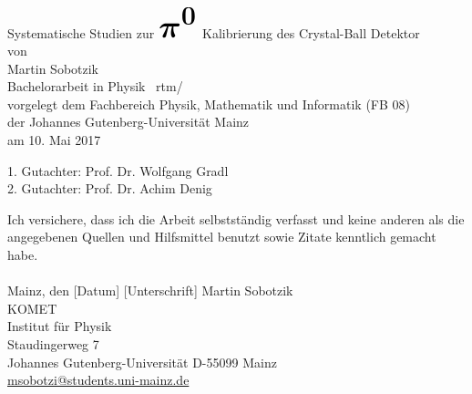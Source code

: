 \documentclass[a4paper,11pt,oneside,final,german,openbib,pdftex]{scrbook}
\begin{document}

\begin{titlepage}
  \vspace*{6mm}
  \begin{center}
     {\afont Systematische Studien zur 
     	$
     	\mathlarger{\mathlarger{\mathlarger{\mathlarger{\mathlarger{\mathlarger{
     									\boldsymbol
     									{
     										\pi^0
     									}
     								}}}}}}
     	$ 
     	Kalibrierung des Crystal-Ball Detektor}
     \\[3.5cm]
     {\large von}
     \\[3.5cm]
     {\dfont Martin Sobotzik}
     \\[2cm]
     {\large Bachelorarbeit in Physik \ rtm/\\
        vorgelegt dem Fachbereich Physik, Mathematik und Informatik (FB 08) \/\\
        der Johannes Gutenberg-Universit\"at Mainz \/\\
        am 10. Mai 2017}
   \end{center}
   \vfill
   1. Gutachter: Prof. Dr. Wolfgang Gradl\\	
   2. Gutachter: Prof. Dr. Achim Denig \\
   \vfill
\end{titlepage}

\thispagestyle{empty}
Ich versichere, dass ich die Arbeit selbstst\"andig verfasst und keine 
anderen als die angegebenen Quellen und Hilfsmittel benutzt sowie 
Zitate kenntlich gemacht habe.
\\
\\[3.5cm] 
Mainz, den [Datum] [Unterschrift]
\vfill
\noindent 
Martin Sobotzik\\
KOMET\\
Institut f\"ur Physik\\
Staudingerweg 7\\
Johannes Gutenberg-Universit\"at
D-55099 Mainz\\
{\url{ msobotzi@students.uni-mainz.de}}

\renewcommand\contentsname{Inhaltsverzeichnis}
\renewcommand\figurename{Abbildung}
\renewcommand\tablename{Tabelle}
\tableofcontents
\clearpage

\mainmatter
\sloppy

\end{document}
